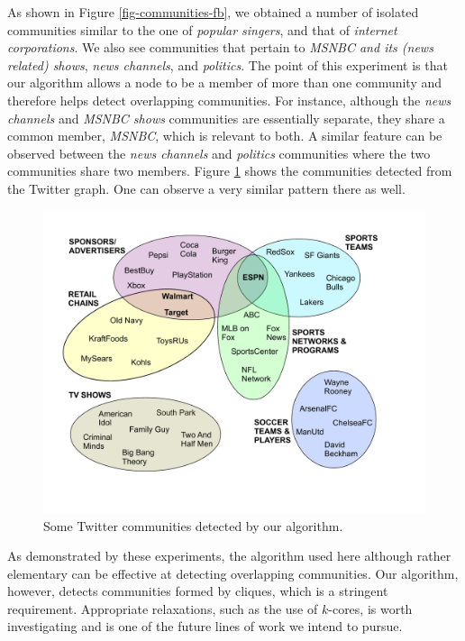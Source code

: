 As shown in Figure \ref{fig-communities-fb}, we obtained a number of isolated communities similar to the one of {\it popular singers}, and that of {\it internet corporations}. We also see communities that pertain to {\it MSNBC and its (news related) shows}, {\it news channels}, and {\it politics}. The point of this experiment is that our algorithm allows a node to be a member of more than one community and therefore helps detect overlapping communities. For instance, although the {\it news channels} and {\it MSNBC shows} communities are essentially separate, they share a common member, {\it MSNBC}, which is relevant to both. 
A similar feature can be observed between the {\it news channels} and  {\it politics} communities
where the two communities share two members. 
Figure \ref{fig-communities-tw} shows the communities detected from the Twitter graph. 
One can observe a very similar pattern there as well.

\begin{figure}%
  \centering
    \includegraphics[scale=0.25]{communities_tw.pdf}
  \caption{Some Twitter communities detected by our algorithm.}
\label{fig-communities-tw}
\end{figure}


As demonstrated by these experiments, the algorithm used here although rather elementary can be effective at detecting overlapping communities. Our algorithm, however, detects communities formed by cliques, which is a stringent requirement. Appropriate relaxations, such as the use of $k$-cores, is worth investigating and is one of
the future lines of work we intend to pursue. 




